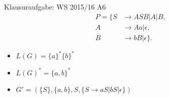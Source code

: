 \begin{frame}{Klausuraufgabe: WS 2015/16 A6}
  \begin{align*}
    P=\{S&\rightarrow ASB | A | B,\\
    A&\rightarrow Aa | \epsilon,\\
    B&\rightarrow bB | \epsilon\}.
  \end{align*}
  \begin{itemize}
    \item $L(G)=$\pause $\{a\}^*\{b\}^*$
    \pause
    \item $L(G)^*=\{a,b\}^*$
    \pause
    \item $G'=(\{S\},\{a,b\},S,\{S\rightarrow aS|bS|\epsilon\})$
  \end{itemize}
\end{frame}

